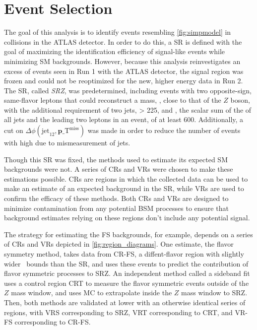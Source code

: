 
\chapter{Event Selection} %
\label{ch:eventsel} 

The goal of this analysis is to identify events resembling \autoref{fig:simpmodel} in collisions in the ATLAS detector. In order to do this, a \acf{SR} is defined with the goal of maximizing the identification efficiency of signal-like events while minimizing \ac{SM} backgrounds. However, because this analysis reinvestigates an excess of events seen in Run 1 with the ATLAS detector, the signal region was frozen and could not be reoptimized for the new, higher energy data in Run 2. The \ac{SR}, called \textit{SRZ}, was predetermined, including events with two opposite-sign, same-flavor leptons that could reconstruct a mass, \mll, close to that of the $Z$ boson, with the additional requirement of two jets, \met > 225\gev, and \HT, the scalar sum of the \pt of all jets and the leading two leptons in an event, of at least 600\gev. Additionally, a cut on $\Delta\phi(\text{jet}_{12},{\boldsymbol p}\_{\mathrm{T}}^\mathrm{miss})$ was made in order to reduce the number of events with high \met due to mismeasurement of jets. 

Though this \ac{SR} was fixed, the methods used to estimate its expected \ac{SM} backgrounds were not. A series of \acfp{CR} and \acfp{VR} were chosen to make these estimations possible. \acp{CR} are regions in which the collected data can be used to make an estimate of an expected background in the \ac{SR}, while \acp{VR} are used to confirm the efficacy of these methods. Both \acp{CR} and \acp{VR} are designed to minimize contamination from any potential \ac{BSM} processes to ensure that background estimates relying on these regions don't include any potential signal. 

The strategy for estimating the \ac{FS} backgrounds, for example, depends on a series of \acp{CR} and \acp{VR} depicted in \autoref{fig:region_diagrams}. One estimate, the flavor symmetry method, takes data from CR-FS, a diffent-flavor region with slightly wider \mll~bounds than the \ac{SR}, and uses these events to predict the contribution of flavor symmetric processes to SRZ. An independent method called a sideband fit uses a control region CRT to measure the flavor symmetric events outside of the $Z$ mass window, and uses \ac{MC} to extrapolate inside the $Z$ mass window to SRZ. Then, both methods are validated at lower \met with an otherwise identical series of regions, with VRS corresponding to SRZ, VRT corresponding to CRT, and VR-FS corresponding to CR-FS. 

